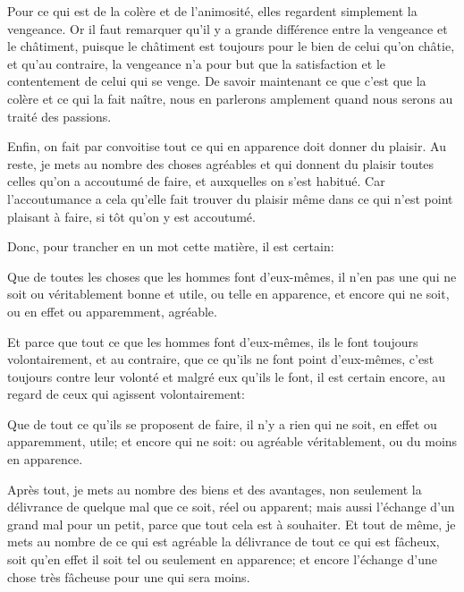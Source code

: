 \bigbreak

Pour ce qui est de la colère et de l'animosité, elles regardent simplement la vengeance. Or il faut remarquer qu'il y a grande
différence entre la vengeance et le châtiment, puisque le châtiment est toujours pour le bien de celui qu'on châtie, et qu'au
contraire, la vengeance n'a pour but que la satisfaction et le contentement de celui qui se venge. De savoir maintenant ce que
c'est que la colère et ce qui la fait naître, nous en parlerons amplement quand nous serons au traité des passions.

\bigbreak

Enfin, on fait par convoitise tout ce qui en apparence doit donner du plaisir. Au reste, je mets au nombre des choses agréables
et qui donnent du plaisir toutes celles qu'on a accoutumé de faire, et auxquelles on s'est habitué. Car l'accoutumance a cela
qu'elle fait trouver du plaisir même dans ce qui n'est point plaisant à faire, si tôt qu'on y est accoutumé.

\bigbreak

Donc, pour trancher en un mot cette matière, il est certain:

\begin{emphpar}
	Que de toutes les choses que les hommes font d'eux-mêmes, il n'en pas une qui ne soit ou véritablement bonne et utile, ou
	telle en apparence, et encore qui ne soit, ou en effet ou apparemment, agréable.
\end{emphpar}

Et parce que tout ce que les hommes font d'eux-mêmes, ils le font toujours volontairement, et au contraire, que ce qu'ils ne
font point d'eux-mêmes, c'est toujours contre leur volonté et malgré eux qu'ils le font, il est certain encore, au regard de
ceux qui agissent volontairement:

\begin{emphpar}
	Que de tout ce qu'ils se proposent de faire, il n'y a rien qui ne soit, en effet ou apparemment, utile; et encore qui ne
	soit: ou agréable véritablement, ou du moins en apparence.
\end{emphpar}

\bigbreak

Après tout, je mets au nombre des biens et des avantages, non seulement la délivrance de quelque mal que ce soit, réel ou
apparent; mais aussi l'échange d'un grand mal pour un petit, parce que tout cela est à souhaiter. Et tout de même, je mets
au nombre de ce qui est agréable la délivrance de tout ce qui est fâcheux, soit qu'en effet il soit tel ou seulement en
apparence; et encore l'échange d'une chose très fâcheuse pour une qui sera moins. 

